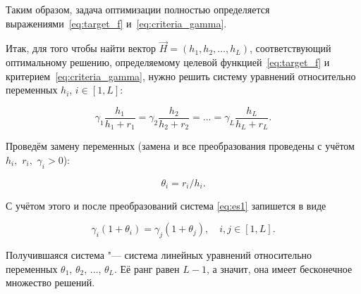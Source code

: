 Таким образом, задача оптимизации полностью определяется выражениями~\eqref{eq:target_f}  и~\eqref{eq:criteria_gamma}.








\smallskip




Итак, для того чтобы найти вектор $\vec{H}=(h_1, h_2, \ldots, h_L)$, соответствующий оптимальному решению, определяемому целевой функцией~\eqref{eq:target_f} и критерием~\eqref{eq:criteria_gamma}, нужно решить систему уравнений относительно переменных $h_i$, $i \in [1, L] $:

\begin{equation}

{\gamma_1 \frac{h_1}{h_1+r_1}} = {\gamma_2 \frac{h_2}{h_2+r_2}} = \dots = {\gamma_L \frac{h_L}{h_L+r_L}}. 

\label{eq:es1}

\end{equation}



Проведём замену переменных (замена и все преобразования проведены с учётом $h_i,$ $r_i,$ $\gamma_i > 0$):

$$

\theta_i = {r_i}/{h_i}.

$$

С учётом этого и после преобразований система \eqref{eq:es1} запишется в виде

$$

{\gamma_i(1+\theta_i) = \gamma_j(1+\theta_j)}, \quad  i, j \in [1, L].

$$

Получившаяся система "--- система линейных уравнений относительно переменных $\theta_1$, $\theta_2$,  $\ldots$, $\theta_L$. Её ранг равен $L-1$, а значит, она имеет бесконечное множество решений.

